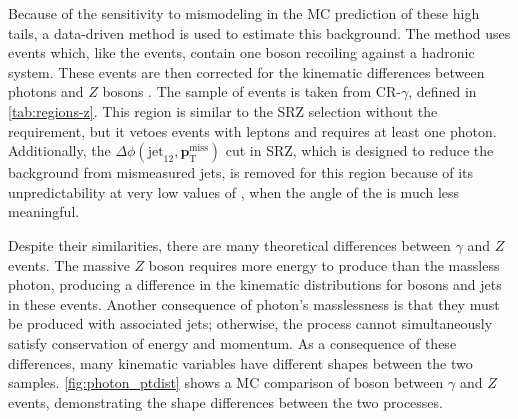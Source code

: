 Because of the sensitivity to mismodeling in the \ac{MC} prediction of these high \met tails, a data-driven method is used to estimate this background. The method uses \gjets events which, like the \dyjets events, contain one boson recoiling against a hadronic system. These \gjets events are then corrected for the kinematic differences between photons and $Z$ bosons \cite{ATLAS:2012ema, Chatrchyan:2012qka}. The sample of \gjets events is taken from CR-$\gamma$, defined in \autoref{tab:regions-z}. This region is similar to the SRZ selection without the \met  requirement, but it vetoes events with leptons and requires at least one photon. Additionally, the $\Delta\phi(\text{jet}_{12},{\boldsymbol p}_{\mathrm{T}}^\mathrm{miss})$ cut in SRZ, which is designed to reduce the background from mismeasured jets, is removed for this region because of its unpredictability at very low values of \met, when the angle of the \met is much less meaningful. 

Despite their similarities, there are many theoretical differences between $\gamma$ and $Z$ events. The massive $Z$ boson requires more energy to produce than the massless photon, producing a difference in the kinematic distributions for bosons and jets in these events. Another consequence of photon's masslessness is that they must be produced with associated jets; otherwise, the process cannot simultaneously satisfy conservation of energy and momentum. As a consequence of these differences, many kinematic variables have different shapes between the two samples. \autoref{fig:photon_ptdist} shows a \ac{MC} comparison of boson \pt between $\gamma$ and $Z$ events, demonstrating the shape differences between the two processes. 

